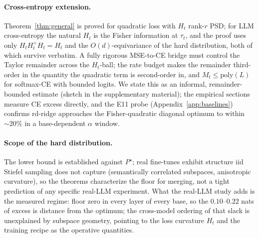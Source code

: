 \paragraph{Cross-entropy extension.} Theorem~\ref{thm:general} is
proved for quadratic loss with $H_t$ rank-$r$ PSD; for LLM
cross-entropy the natural $H_t$ is the Fisher information at $\tau_t$,
and the proof uses only $H_tH_t^+H_t = H_t$ and the
$O(d)$-equivariance of the hard distribution, both of which survive
verbatim. A fully rigorous MSE-to-CE bridge must control the Taylor
remainder across the $H_t$-ball; the rate budget makes the remainder
third-order in the quantity the quadratic term is second-order in, and
$M_t \leq \mathrm{poly}(L)$ for softmax-CE with bounded logits. We
state this as an informal, remainder-bounded estimate (sketch in the
supplementary material); the empirical sections measure CE excess
directly, and the E11 probe (Appendix~\ref{app:baselines}) confirms
rd-ridge approaches the Fisher-quadratic diagonal optimum to within
$\sim 20\%$ in a base-dependent $\alpha$ window.

\paragraph{Scope of the hard distribution.} The lower bound is
established against $P^\star$; real fine-tunes exhibit structure iid
Stiefel sampling does not capture (semantically correlated subspaces,
anisotropic curvature), so the theorems characterize the floor for
merging, not a tight prediction of any specific real-LLM experiment.
What the real-LLM study adds is the
measured regime: floor zero in every layer of every base, so the
$0.10$--$0.22$ nats of excess is distance from the optimum; the
cross-model ordering of that slack is unexplained by subspace
geometry, pointing to the loss curvature $H_t$ and the training
recipe as the operative quantities.

